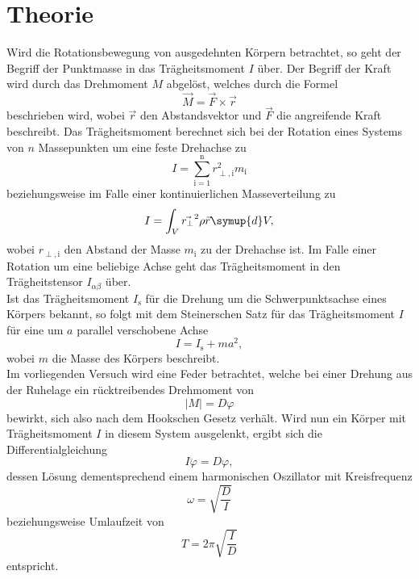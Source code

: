 \section{Theorie}
\label{sec:Theorie}
Wird die Rotationsbewegung von ausgedehnten Körpern betrachtet, so geht der Begriff der Punktmasse in das Trägheitsmoment $I$ über.
Der Begriff der Kraft wird durch das Drehmoment $M$ abgelöst, welches durch die Formel
\begin{equation}
  \vec{M} = \vec{F} \times \vec{r}
\end{equation}
beschrieben wird, wobei $\vec{r}$ den Abstandsvektor und $\vec{F}$ die angreifende Kraft beschreibt.
Das Trägheitsmoment berechnet sich bei der Rotation eines Systems von $n$ Massepunkten um eine feste Drehachse zu
\begin{equation}
  I = \sum_{\text{i}=1}^\text{n} r_{\perp, \text{i}}^2 m_\text{i}
  \label{eqn:tm1}
\end{equation}
beziehungsweise im Falle einer kontinuierlichen Masseverteilung zu
\begin{equation}
  I = \int_V^{} \vec{r_{\perp}}^2 \rho{\vec{r}} \symup{d}V,
  \label{eqn:tm2}
\end{equation}
wobei $r_{\perp, \text{i}}$ den Abstand der Masse $m_\text{i}$ zu der Drehachse ist.
Im Falle einer Rotation um eine beliebige Achse geht das Trägheitsmoment in den Trägheitstensor $I_{\alpha \beta}$ über.\\
Ist das Trägheitsmoment $I_\text{s}$ für die Drehung um die Schwerpunktsachse eines Körpers bekannt, so folgt mit dem Steinerschen Satz für das Trägheitsmoment $I$ für eine um $a$ parallel verschobene Achse
\begin{equation}
  I = I_\text{s} + m a^2,
  \label{eqn:steiner}
\end{equation}
wobei $m$ die Masse des Körpers beschreibt.\\
Im vorliegenden Versuch wird eine Feder betrachtet, welche bei einer Drehung aus der Ruhelage ein rücktreibendes Drehmoment von
\begin{equation}
  \lvert M \rvert = D \varphi
\end{equation}
bewirkt, sich also nach dem Hookschen Gesetz verhält.
Wird nun ein Körper mit Trägheitsmoment $I$ in diesem System ausgelenkt, ergibt sich die Differentialgleichung
\begin{equation}
  I \ddot{\varphi} = D \varphi,
\end{equation}
dessen Lösung dementsprechend einem harmonischen Oszillator mit Kreisfrequenz
\begin{equation}
  \omega = \sqrt{\frac{D}{I}}
\end{equation}
beziehungsweise Umlaufzeit von
\begin{equation}
  T = 2 \pi \sqrt{\frac{I}{D}} \label{eqn:zeiten}
\end{equation}
entspricht.

